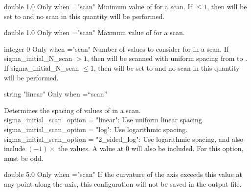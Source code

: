 \myhrule

{double}
{1.0}
{Only when ={\ttfamily "scan"}}
{Minimum value of  for a scan. If $\le 1$, then  will be set to  and no scan in this quantity will be performed.
}

\myhrule

{double}
{1.0}
{Only when ={\ttfamily "scan"}}
{Maxmum value of  for a scan.
}

\myhrule

{integer}
{0}
{Only when ={\ttfamily "scan"}}
{Number of values to consider for  in a scan. If {\ttfamily sigma\_initial\_N\_scan} $>1$, then  will be scanned with uniform spacing from  to .
If {\ttfamily sigma\_initial\_N\_scan} $\le 1$, then  will be set to  and no scan in
this quantity will be performed.
}

\myhrule

{string}
{{\ttfamily "linear"}}
{Only when ={\ttfamily ``scan''}}
{Determines the spacing of values of  in a scan.\\

{\ttfamily sigma\_initial\_scan\_option} = {\ttfamily "linear"}: Use uniform linear spacing.\\

{\ttfamily sigma\_initial\_scan\_option} = {\ttfamily "log"}: Use logarithmic spacing.\\

{\ttfamily sigma\_initial\_scan\_option} = {\ttfamily "2\_sided\_log"}: Use logarithmic spacing, and also include $(-1)\times$ the values. A value at 0 will also be included. For this option,  must be odd.

}

\myhrule

{double}
{5.0}
{Only when ={\ttfamily "scan"}}
{If the curvature of the axis exceeds this value
at any point along the axis, this configuration will not be saved in the output file.
}

